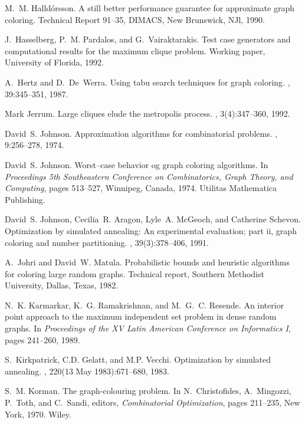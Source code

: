 \begin{thebibliography}{10}
M.~M. Halld\'orsson.
\newblock A still better performance guarantee for approximate graph coloring.
\newblock Technical Report 91--35, DIMACS, New Brunswick, NJl, 1990.

J.~Hasselberg, P.~M. Pardalos, and G.~Vairaktarakis.
\newblock Test case generators and computational results for the maximum clique
  problem.
\newblock Working paper, University of Florida, 1992.

A.~Hertz and D.~De~Werra.
\newblock Using tabu search techniques for graph coloring.
, 39:345--351, 1987.

Mark Jerrum.
\newblock Large cliques elude the metropolis process.
, 3(4):347--360, 1992.

David~S. Johnson.
\newblock Approximation algorithms for combinatorial problems.
, 9:256--278, 1974.

David~S. Johnson.
\newblock Worst--case behavior og graph coloring algorithms.
\newblock In {\em Proceedings 5th Southeastern Conference on Combinatorics,
  Graph Theory, and Computing}, pages 513--527, Winnipeg, Canada, 1974.
  Utilitas Mathematica Publishing.

David~S. Johnson, Cecilia~R. Aragon, Lyle~A. McGeoch, and Catherine Schevon.
\newblock Optimization by simulated annealing: An experimental evaluation; part
  ii, graph coloring and number partitioning.
, 39(3):378--406, 1991.

A.~Johri and David~W. Matula.
\newblock Probabilistic bounds and heuristic algorithms for coloring large
  random graphs.
\newblock Technical report, Southern Methodist University, Dallas, Texas, 1982.

N.~K. Karmarkar, K.~G. Ramakrishnan, and M.~G.~C. Resende.
\newblock An interior point approach to the maximum independent set problem in
  dense random graphs.
\newblock In {\em Proceedings of the XV Latin American Conference on
  Informatics I}, pages 241--260, 1989.

S.~Kirkpatrick, C.D. Gelatt, and M.P. Vecchi.
\newblock Optimization by simulated annealing.
, 220(13 May 1983):671--680, 1983.

S.~M. Korman.
\newblock The graph-colouring problem.
\newblock In N.~Christofides, A.~Mingozzi, P.~Toth, and C.~Sandi, editors, {\em
  Combinatorial Optimization}, pages 211--235, New York, 1970. Wiley.


\end{thebibliography}
